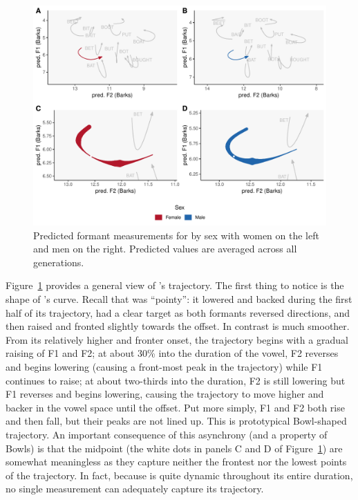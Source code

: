 \begin{figure}[tb!]
    \centering
    \includegraphics[width = 6.5in]{Figures/BAN/BAN_four_panel_plot_summarized.pdf}
    \caption[Predicted formant measurements for \ban by sex.]{Predicted formant measurements for \ban by sex with women on the left and men on the right. Predicted values are averaged across all generations.}
    \label{fig:BAN_four_panel_plot_summarized}
\end{figure}

Figure~\ref{fig:BAN_four_panel_plot_summarized} provides a general view of \ban's trajectory. The first thing to notice is the shape of \ban's curve. Recall that \bat was ``pointy'': it lowered and backed during the first half of its trajectory, had a clear target as both formants reversed directions, and then raised and fronted slightly towards the offset. In contrast \ban is much smoother. From its relatively higher and fronter onset, the trajectory begins with a gradual raising of F1 and F2; at about 30\% into the duration of the vowel, F2 reverses and begins lowering (causing a front-most peak in the trajectory) while F1 continues to raise; at about two-thirds into the duration, F2 is still lowering but F1 reverses and begins lowering, causing the trajectory to move higher and backer in the vowel space until the offset. Put more simply, F1 and F2 both rise and then fall, but their peaks are not lined up. This is prototypical Bowl-shaped trajectory. An important consequence of this asynchrony (and a property of Bowls) is that the midpoint (the white dots in panels C and D of Figure~\ref{fig:BAN_four_panel_plot_summarized}) are somewhat meaningless as they capture neither the frontest nor the lowest points of the trajectory. In fact, because \ban is quite dynamic throughout its entire duration, no single measurement can adequately capture its trajectory.

